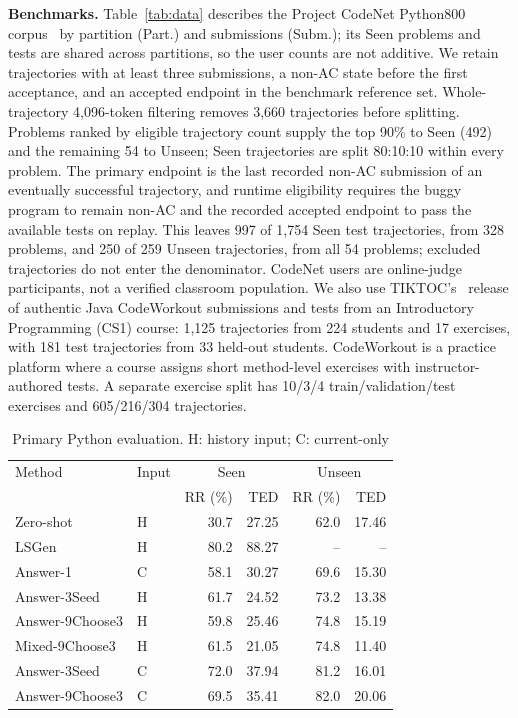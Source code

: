 \documentclass[10pt,conference]{IEEEtran}
\begin{document}
\noindent\textbf{Benchmarks.} Table~\ref{tab:data} describes the Project CodeNet Python800 corpus~\cite{puri2021codenet} by partition (Part.) and submissions (Subm.); its Seen problems and tests are shared across partitions, so the user counts are not additive. We retain trajectories with at least three submissions, a non-AC state before the first acceptance, and an accepted endpoint in the benchmark reference set. Whole-trajectory 4,096-token filtering removes 3,660 trajectories before splitting. Problems ranked by eligible trajectory count supply the top 90\% to Seen (492) and the remaining 54 to Unseen; Seen trajectories are split 80:10:10 within every problem. The primary endpoint is the last recorded non-AC submission of an eventually successful trajectory, and runtime eligibility requires the buggy program to remain non-AC and the recorded accepted endpoint to pass the available tests on replay. This leaves 997 of 1,754 Seen test trajectories, from 328 problems, and 250 of 259 Unseen trajectories, from all 54 problems; excluded trajectories do not enter the denominator. CodeNet users are online-judge participants, not a verified classroom population. We also use TIKTOC's~\cite{duan2024tiktoc} release of authentic Java CodeWorkout submissions and tests from an Introductory Programming (CS1) course: 1,125 trajectories from 224 students and 17 exercises, with 181 test trajectories from 33 held-out students. CodeWorkout is a practice platform where a course assigns short method-level exercises with instructor-authored tests. A separate exercise split has 10/3/4 train/validation/test exercises and 605/216/304 trajectories.

\begin{table}[h]
\caption{Primary Python evaluation. H: history input; C: current-only}
\label{tab:main}
\centering\small
\begin{tabular}{@{}ll||rr|rr@{}}
\toprule
Method & Input & \multicolumn{2}{c|}{Seen} & \multicolumn{2}{c}{Unseen} \\
 & & RR (\%) & TED & RR (\%) & TED \\
\midrule
Zero-shot & H & 30.7 & 27.25 & 62.0 & 17.46 \\
LSGen & H & 80.2 & 88.27 & -- & -- \\
Answer-1 & C & 58.1 & 30.27 & 69.6 & 15.30 \\
Answer-3Seed & H & 61.7 & 24.52 & 73.2 & 13.38 \\
Answer-9Choose3 & H & 59.8 & 25.46 & 74.8 & 15.19 \\
Mixed-9Choose3 & H & 61.5 & 21.05 & 74.8 & 11.40 \\
\midrule
Answer-3Seed & C & 72.0 & 37.94 & 81.2 & 16.01 \\
Answer-9Choose3 & C & 69.5 & 35.41 & 82.0 & 20.06 \\
\bottomrule
\end{tabular}
\end{table}
\end{document}
